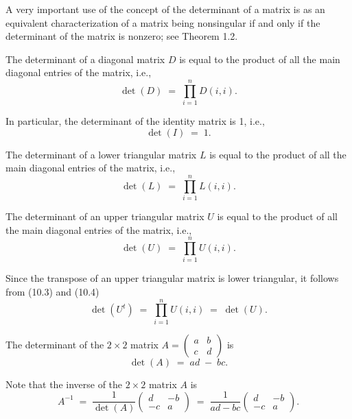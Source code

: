 A very important use of the concept of the determinant of a matrix is as an equivalent
characterization of a matrix being nonsingular if and only if the determinant of the
matrix is nonzero; see Theorem 1.2.

The determinant of a diagonal matrix $D$ is equal to the product of all the main
diagonal entries of the matrix, i.e.,
\begin{equation}
\det(D) \;=\; \prod_{i=1}^n D(i,i).
\end{equation}

In particular, the determinant of the identity matrix is 1, i.e.,
\begin{equation}
\det(I) \;=\; 1.
\end{equation}

The determinant of a lower triangular matrix $L$ is equal to the product of all the
main diagonal entries of the matrix, i.e.,
\begin{equation}
\det(L) \;=\; \prod_{i=1}^n L(i,i).
\end{equation}

The determinant of an upper triangular matrix $U$ is equal to the product of all the
main diagonal entries of the matrix, i.e.,
\begin{equation}
\det(U) \;=\; \prod_{i=1}^n U(i,i).
\end{equation}

Since the transpose of an upper triangular matrix is lower triangular, it follows from
(10.3) and (10.4)
\begin{equation}
\det(U^t) \;=\; \prod_{i=1}^n U(i,i) \;=\; \det(U).
\end{equation}

The determinant of the $2\times2$ matrix $A = \begin{pmatrix} a & b \\ c & d
\end{pmatrix}$ is
\begin{equation}
\det(A) \;=\; ad \;-\; bc.
\end{equation}

Note that the inverse of the $2\times2$ matrix $A$ is
\begin{equation}
A^{-1} \;=\; \frac{1}{\det(A)}\begin{pmatrix} d & -b \\ -c & a \end{pmatrix}
\;=\; \frac{1}{ad-bc}\begin{pmatrix} d & -b \\ -c & a \end{pmatrix}.
\end{equation}

